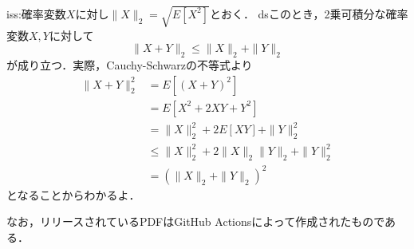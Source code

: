 \documentclass{jsarticle}
\begin{document}
iss:確率変数$X$に対し$\|X\|_2=\sqrt{E[X^2]}$とおく．
dsこのとき，2乗可積分な確率変数$X,Y$に対して
\[ \|X+Y\|_2\leq\|X\|_2+\|Y\|_2 \]
が成り立つ．実際，Cauchy-Schwarzの不等式より
\begin{align*}
\|X+Y\|_2^2
&=E[(X+Y)^2] \\
&=E[X^2+2XY+Y^2] \\
&=\|X\|_2^2+2E[XY]+\|Y\|_2^2 \\
&\leq\|X\|_2^2+2\|X\|_2\|Y\|_2+\|Y\|_2^2 \\
&=(\|X\|_2+\|Y\|_2)^2
\end{align*}
となることからわかるよ．

なお，リリースされているPDFはGitHub Actionsによって作成されたものである．
\end{document}
